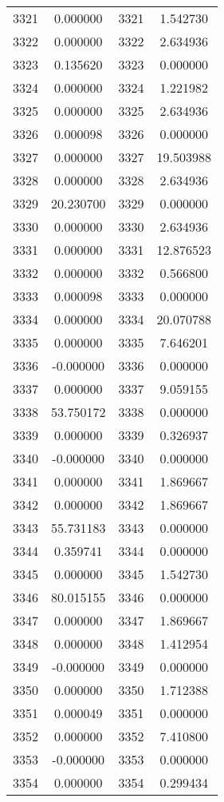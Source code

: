 \documentclass[12pt]{article}
\begin{document}
\begin{longtable}{@{}cccc@{}}
3321 & 0.000000 & 3321 & 1.542730 \\
3322 & 0.000000 & 3322 & 2.634936 \\
3323 & 0.135620 & 3323 & 0.000000 \\
3324 & 0.000000 & 3324 & 1.221982 \\
3325 & 0.000000 & 3325 & 2.634936 \\
3326 & 0.000098 & 3326 & 0.000000 \\
3327 & 0.000000 & 3327 & 19.503988 \\
3328 & 0.000000 & 3328 & 2.634936 \\
3329 & 20.230700 & 3329 & 0.000000 \\
3330 & 0.000000 & 3330 & 2.634936 \\
3331 & 0.000000 & 3331 & 12.876523 \\
3332 & 0.000000 & 3332 & 0.566800 \\
3333 & 0.000098 & 3333 & 0.000000 \\
3334 & 0.000000 & 3334 & 20.070788 \\
3335 & 0.000000 & 3335 & 7.646201 \\
3336 & -0.000000 & 3336 & 0.000000 \\
3337 & 0.000000 & 3337 & 9.059155 \\
3338 & 53.750172 & 3338 & 0.000000 \\
3339 & 0.000000 & 3339 & 0.326937 \\
3340 & -0.000000 & 3340 & 0.000000 \\
3341 & 0.000000 & 3341 & 1.869667 \\
3342 & 0.000000 & 3342 & 1.869667 \\
3343 & 55.731183 & 3343 & 0.000000 \\
3344 & 0.359741 & 3344 & 0.000000 \\
3345 & 0.000000 & 3345 & 1.542730 \\
3346 & 80.015155 & 3346 & 0.000000 \\
3347 & 0.000000 & 3347 & 1.869667 \\
3348 & 0.000000 & 3348 & 1.412954 \\
3349 & -0.000000 & 3349 & 0.000000 \\
3350 & 0.000000 & 3350 & 1.712388 \\
3351 & 0.000049 & 3351 & 0.000000 \\
3352 & 0.000000 & 3352 & 7.410800 \\
3353 & -0.000000 & 3353 & 0.000000 \\
3354 & 0.000000 & 3354 & 0.299434 \\

\end{longtable}
\end{document}
